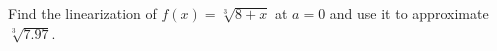 Find the linearization of $f(x)=\sqrt[3]{8+x}$ at $a=0$ and use it to approximate $\sqrt[3] {7.97}$.

